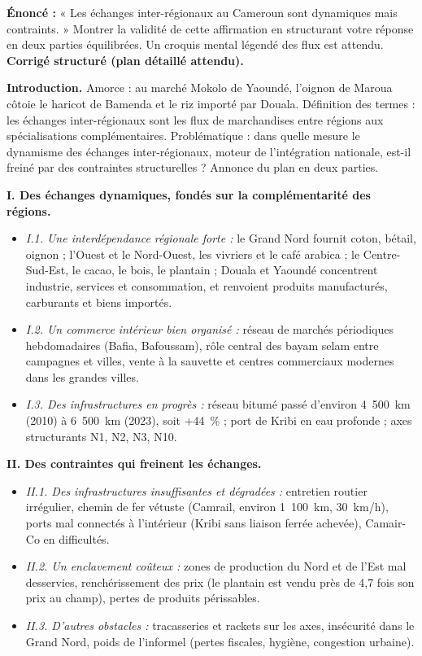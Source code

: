 \documentclass[11pt]{article}
\begin{document}
\begin{corrige}
\textbf{Énoncé :} « Les échanges inter-régionaux au Cameroun sont dynamiques mais contraints. » Montrer la validité de cette affirmation en structurant votre réponse en deux parties équilibrées. Un croquis mental légendé des flux est attendu.
\tcblower
\textbf{Corrigé structuré (plan détaillé attendu).}

\textbf{Introduction.} Amorce : au marché Mokolo de Yaoundé, l'oignon de Maroua côtoie le haricot de Bamenda et le riz importé par Douala. Définition des termes : les échanges inter-régionaux sont les flux de marchandises entre régions aux spécialisations complémentaires. Problématique : dans quelle mesure le dynamisme des échanges inter-régionaux, moteur de l'intégration nationale, est-il freiné par des contraintes structurelles ? Annonce du plan en deux parties.

\textbf{I. Des échanges dynamiques, fondés sur la complémentarité des régions.}
\begin{itemize}
    \item \emph{I.1. Une interdépendance régionale forte :} le Grand Nord fournit coton, bétail, oignon ; l'Ouest et le Nord-Ouest, les vivriers et le café arabica ; le Centre-Sud-Est, le cacao, le bois, le plantain ; Douala et Yaoundé concentrent industrie, services et consommation, et renvoient produits manufacturés, carburants et biens importés.
    \item \emph{I.2. Un commerce intérieur bien organisé :} réseau de marchés périodiques hebdomadaires (Bafia, Bafoussam), rôle central des bayam selam entre campagnes et villes, vente à la sauvette et centres commerciaux modernes dans les grandes villes.
    \item \emph{I.3. Des infrastructures en progrès :} réseau bitumé passé d'environ 4~500~km (2010) à 6~500~km (2023), soit +44~\% ; port de Kribi en eau profonde ; axes structurants N1, N2, N3, N10.
\end{itemize}

\textbf{II. Des contraintes qui freinent les échanges.}
\begin{itemize}
    \item \emph{II.1. Des infrastructures insuffisantes et dégradées :} entretien routier irrégulier, chemin de fer vétuste (Camrail, environ 1~100~km, 30~km/h), ports mal connectés à l'intérieur (Kribi sans liaison ferrée achevée), Camair-Co en difficultés.
    \item \emph{II.2. Un enclavement coûteux :} zones de production du Nord et de l'Est mal desservies, renchérissement des prix (le plantain est vendu près de 4,7 fois son prix au champ), pertes de produits périssables.
    \item \emph{II.3. D'autres obstacles :} tracasseries et rackets sur les axes, insécurité dans le Grand Nord, poids de l'informel (pertes fiscales, hygiène, congestion urbaine).
\end{itemize}


\end{corrige}
\end{document}
